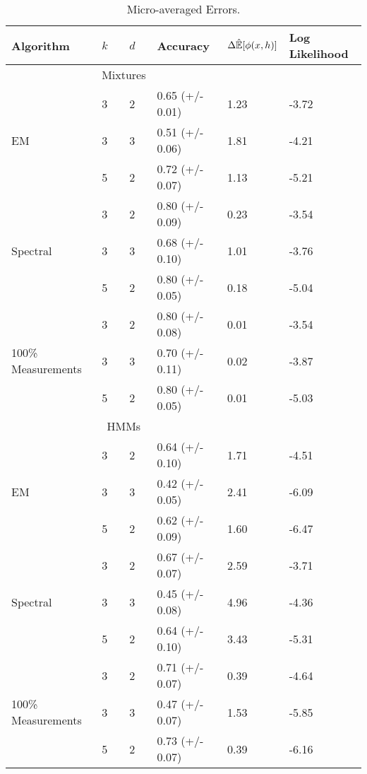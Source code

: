 \begin{table}
    \label{tab:errors}
    \begin{tabular}{l | l l | l l l }
        Algorithm & $k$ & $d$ & Accuracy & $\Delta \hat {\mathbb{E}}[\phi(x,h)]$ & Log Likelihood \\ \hline
        & \multicolumn{2}{|c|}{Mixtures} & & & \\ \hline
        \multirow{3}{*}{EM} 
        & 3 & 2 & 0.65 (+/- 0.01) & 1.23 & -3.72 \\
        & 3 & 3 & 0.51 (+/- 0.06) & 1.81 & -4.21\\
        & 5 & 2 & 0.72 (+/- 0.07) & 1.13 & -5.21\\ \hline
        \multirow{3}{*}{Spectral} 
        & 3 & 2 & 0.80 (+/- 0.09) & 0.23 & -3.54 \\
        & 3 & 3 & 0.68 (+/- 0.10) & 1.01 & -3.76 \\
        & 5 & 2 & 0.80 (+/- 0.05) & 0.18 & -5.04 \\ \hline
        \multirow{3}{*}{100\% Measurements} 
        & 3 & 2 & 0.80 (+/- 0.08) & 0.01& -3.54 \\
        & 3 & 3 & 0.70 (+/- 0.11) & 0.02& -3.87 \\
        & 5 & 2 & 0.80 (+/- 0.05) & 0.01& -5.03 \\ \hline
        & \multicolumn{2}{|c|}{HMMs} & & & \\ \hline
        \multirow{3}{*}{EM} 
& 3 & 2 & 0.64 (+/- 0.10) & 1.71 & -4.51 \\  
& 3 & 3 & 0.42 (+/- 0.05) & 2.41 & -6.09 \\  
& 5 & 2 & 0.62 (+/- 0.09) & 1.60 & -6.47 \\  \hline
        \multirow{3}{*}{Spectral} 
& 3 & 2 & 0.67 (+/- 0.07) & 2.59 & -3.71 \\ 
& 3 & 3 & 0.45 (+/- 0.08) & 4.96 & -4.36 \\ 
& 5 & 2 & 0.64 (+/- 0.10) & 3.43 & -5.31 \\ \hline
        \multirow{3}{*}{100\% Measurements} 
& 3 & 2 & 0.71 (+/- 0.07) & 0.39 & -4.64 \\ 
& 3 & 3 & 0.47 (+/- 0.07) & 1.53 & -5.85 \\ 
& 5 & 2 & 0.73 (+/- 0.07) & 0.39 & -6.16 \\ \hline
    \end{tabular}
    \caption{Micro-averaged Errors.}
\end{table}


